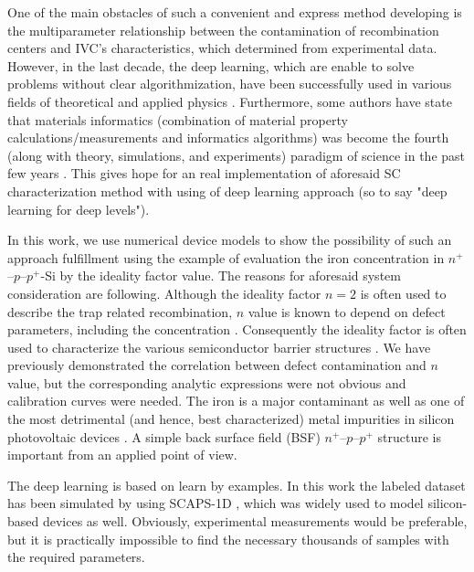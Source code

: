 \documentclass[journal]{IEEEtran}
\begin{document}
One of the main obstacles of such a convenient and express method developing is the multiparameter relationship between the contamination of recombination centers and IVC's characteristics, which determined from experimental data.
However, in the last decade, the deep learning, which are enable to solve problems without clear algorithmization, have been successfully used in various fields of theoretical and applied physics \cite{MachLean_RevModPhys,MachLeanJAP,MachLeanPPV}.
Furthermore, some authors have state that materials informatics 
(combination of material property calculations/measurements and informatics algorithms)
was become the fourth (along with theory, simulations, and experiments) paradigm of science in the past few years \cite{MI_JAP}.
This gives hope for an real implementation of aforesaid SC characterization method with using of deep learning approach (so to say "deep learning for deep levels").

In this work, we use numerical device models to show the possibility of such an approach fulfillment using the example of evaluation the iron concentration in $n^+$--$p$--$p^+$-Si by the ideality factor value.
The reasons for aforesaid system consideration are following.
Although the ideality factor $n=2$ is often used to describe the trap related recombination, $n$ value is known to depend on defect parameters, including the concentration \cite{n2_Beier,n2McIntosh,n2Kaminski,HAMEIRI2013251,Heide}.
Consequently the ideality factor is often used to characterize the various
semiconductor barrier structures \cite{Heide,Duan,n_CharGaN,n_CharSemic,n_CharPhysRevAppl}.
We have previously demonstrated \cite{Olikh2019SM} the correlation between defect contamination and $n$ value, but the corresponding analytic expressions were not obvious and calibration curves were needed.
The iron is a major contaminant as well as one of the most detrimental (and hence, best
characterized)
metal impurities in silicon photovoltaic devices \cite{HowMuchPhysics,FeB:Schmidt}.
A simple back surface field (BSF) $n^+$--$p$--$p^+$ structure is important from an applied point of view.


The deep learning is based on learn by examples.
In this work the labeled dataset has been simulated by using SCAPS-1D \cite{SCAPS1,SCAPS2}, which was widely used to model silicon-based devices \cite{SCAPSuseSi4,SCAPSuseSi1,SCAPSuseSi6} as well.
Obviously, experimental measurements would be preferable, but it is practically impossible to find the necessary thousands of samples with the required parameters. 
\end{document}
